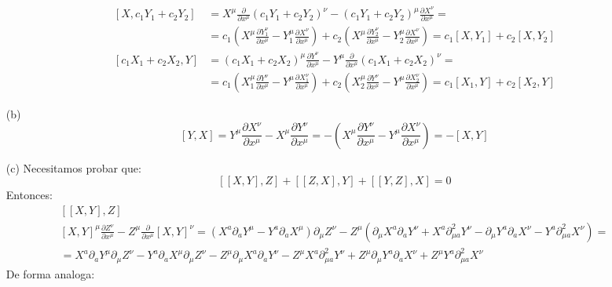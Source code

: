 \documentclass{article}
\begin{document}
\begin{enumerate}
\[\begin{aligned}
 [X, c_1 Y_1 + c_2 Y_2 ] & = X^{\mu} \frac{ \partial}{ \partial x^{\mu} } ( c_1 Y_1 + c_2 Y_2)^{\nu} - ( c_1 Y_1 + c_2 Y_2)^{\mu}  \frac{ \partial X^{\nu} }{ \partial x^{\mu} } = \\
   & = c_1 \left( X^{\mu} \frac{ \partial Y_1^{\nu} }{ \partial x^{\mu}  } - Y_1^{\mu} \frac{ \partial X^{\nu }}{ \partial x^{\mu }} \right) + c_2 \left( X^{\mu} \frac{ \partial Y_2^{\nu} }{  \partial x^{\mu} } - Y_2^{\mu} \frac{ \partial X^{\nu }}{ \partial x^{\mu} } \right) = c_1 [ X,Y_1] + c_2[ X,Y_2]  \\
   [c_1 X_1 + c_2 X_2, Y ] & = (c_1 X_1 + c_2 X_2)^{\mu} \frac{ \partial Y^{\nu}}{ \partial x^{\mu} } - Y^{\mu} \frac{ \partial }{ \partial x^{\mu} }( c_1 X_1 + c_2 X_2)^{\nu} = \\
   & = c_1 \left( X_1^{\mu} \frac{ \partial Y^{\nu}}{ \partial x^{\mu} } - Y^{\mu} \frac{ \partial X_1^{\nu}}{ \partial x^{\mu }} \right) + c_2 \left( X_2^{\mu} \frac{ \partial Y^{\nu }}{ \partial x^{\mu }} - Y^{\mu} \frac{ \partial X_2^{\nu }}{ \partial x^{\mu}} \right) = c_1 [X_1, Y] + c_2 [ X_2, Y ] 
\end{aligned}
\]
\item[(b)] \[
[Y,X] = Y^{\mu} \frac{ \partial X^{\nu}}{ \partial x^{\mu} } - X^{\mu} \frac{ \partial Y^{\nu }}{ \partial x^{\mu }} = - \left( X^{\mu} \frac{ \partial Y^{\nu }}{ \partial x^{\mu} } - Y^{\mu} \frac{ \partial X^{\nu}}{ \partial x^{\mu }} \right) = - [ X,Y]
\]
\item[(c)] Necesitamos probar que: 
\[
[[X,Y],Z] + [[Z,X],Y] + [[Y,Z], X] = 0 
\]
Entonces:
\[
\begin{gathered}
  [[X,Y],Z] \\
  [X,Y]^{\mu} \frac{ \partial Z^{\nu}}{ \partial x^{\mu }} - Z^{\mu} \frac{ \partial}{ \partial x^{\mu}} [X,Y]^{\nu} = (X^a \partial_a Y^{\mu} - Y^a \partial_a X^{\mu} ) \partial_{\mu}Z^{\nu} - Z^{\mu} ( \partial_{\mu}X^a \partial_a  Y^{\nu} + X^a \partial^2_{\mu a} Y^{\nu} - \partial_{\mu} Y^a\partial_a X^{\nu} - Y^a \partial^2_{\mu a} X^{\nu} ) = \\
  = X^a \partial_a Y^{\mu} \partial_{\mu} Z^{\nu} - Y^a \partial_a X^{\mu} \partial_{\mu} Z^{\nu} - Z^{\mu} \partial_{\mu} X^a \partial_a Y^{\nu} -Z^{\mu}X^a \partial^2_{\mu a} Y^{\nu} + Z^{\mu} \partial_{\mu} Y^a \partial_a X^{\nu} + Z^{\mu} Y^a \partial^2_{\mu a} X^{\nu} 
\end{gathered}
\]
De forma analoga:
\[
\begin{gathered}

\end{gathered}\]
\end{enumerate}
\end{document}
